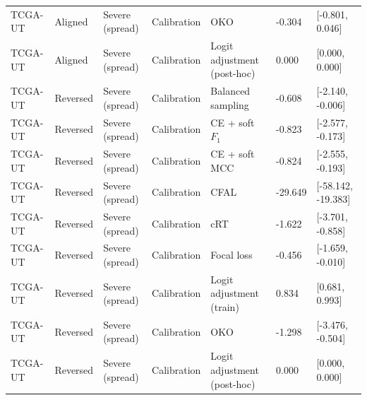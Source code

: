 \begin{longtable}{lllllll}
TCGA-UT & Aligned & Severe (spread) & Calibration & OKO & -0.304 & [-0.801, 0.046] \\
TCGA-UT & Aligned & Severe (spread) & Calibration & Logit adjustment (post-hoc) & 0.000 & [0.000, 0.000] \\
TCGA-UT & Reversed & Severe (spread) & Calibration & Balanced sampling & -0.608 & [-2.140, -0.006] \\
TCGA-UT & Reversed & Severe (spread) & Calibration & CE + soft $F_1$ & -0.823 & [-2.577, -0.173] \\
TCGA-UT & Reversed & Severe (spread) & Calibration & CE + soft MCC & -0.824 & [-2.555, -0.193] \\
TCGA-UT & Reversed & Severe (spread) & Calibration & CFAL & -29.649 & [-58.142, -19.383] \\
TCGA-UT & Reversed & Severe (spread) & Calibration & cRT & -1.622 & [-3.701, -0.858] \\
TCGA-UT & Reversed & Severe (spread) & Calibration & Focal loss & -0.456 & [-1.659, -0.010] \\
TCGA-UT & Reversed & Severe (spread) & Calibration & Logit adjustment (train) & 0.834 & [0.681, 0.993] \\
TCGA-UT & Reversed & Severe (spread) & Calibration & OKO & -1.298 & [-3.476, -0.504] \\
TCGA-UT & Reversed & Severe (spread) & Calibration & Logit adjustment (post-hoc) & 0.000 & [0.000, 0.000] \\
\end{longtable}
